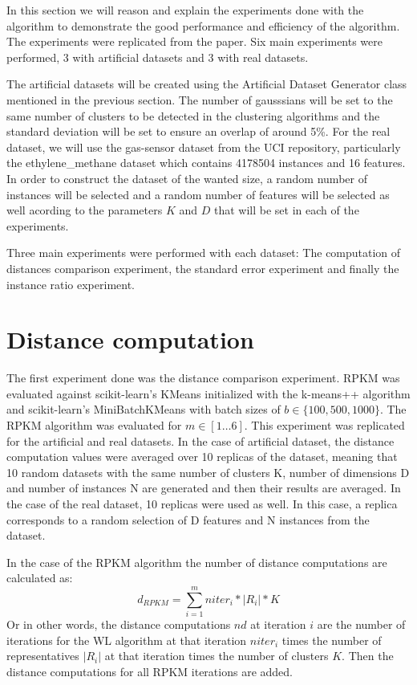 In this section we will reason and explain the experiments done with the algorithm to demonstrate the good performance and efficiency of the algorithm. The experiments were replicated from the paper. Six main experiments were performed, 3 with artificial datasets and 3 with real datasets.

The artificial datasets will be created using the Artificial Dataset Generator class mentioned in the previous section. The number of gausssians will be set to the same number of clusters to be detected in the clustering algorithms and the standard deviation will be set to ensure an overlap of around 5\%. For the real dataset, we will use the gas-sensor dataset from the UCI repository, particularly the ethylene\_methane dataset which contains 4178504 instances and 16 features. In order to construct the dataset of the wanted size, a random number of instances will be selected and a random number of features will be selected as well acording to the parameters $K$ and $D$ that will be set in each of the experiments.

Three main experiments were performed with each dataset: The computation of distances comparison experiment, the standard error experiment and finally the instance ratio experiment.

\section{Distance computation}

The first experiment done was the distance comparison experiment. RPKM was evaluated against scikit-learn's KMeans initialized with the k-means++ algorithm and scikit-learn's MiniBatchKMeans with batch sizes of $b \in \{100, 500, 1000\}$. The RPKM algorithm was evaluated for $m \in [1\dots6]$. This experiment was replicated for the artificial and real datasets. In the case of artificial dataset, the distance computation values were averaged over 10 replicas of the dataset, meaning that 10 random datasets with the same number of clusters K, number of dimensions D and number of instances N are generated and then their results are averaged. In the case of the real dataset, 10 replicas were used as well. In this case, a replica corresponds to a random selection of D features and N instances from the dataset.

In the case of the RPKM algorithm the number of distance computations are calculated as:
$$d_{RPKM} = \sum_{i=1}^m niter_i * |R_i| *K$$
Or in other words, the distance computations $nd$ at iteration $i$ are the number of iterations for the WL algorithm at that iteration $niter_i$ times the number of representatives $|R_i|$ at that iteration times the number of clusters $K$. Then the distance computations for all RPKM iterations are added.

